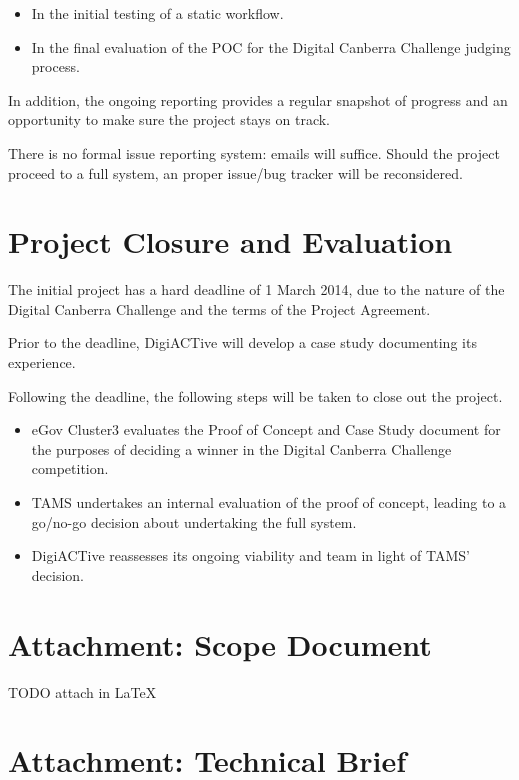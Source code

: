 \documentclass[12pt,a4paper,twosided]{article}
\begin{document}
\begin{itemize}
\itemsep1pt\parskip0pt
\item
  In the initial testing of a static workflow.
\item
  In the final evaluation of the POC for the Digital Canberra Challenge
  judging process.
\end{itemize}

In addition, the ongoing reporting provides a regular snapshot of
progress and an opportunity to make sure the project stays on track.

There is no formal issue reporting system: emails will suffice. Should
the project proceed to a full system, an proper issue/bug tracker will
be reconsidered.

\section{Project Closure and Evaluation}

The initial project has a hard deadline of 1 March 2014, due to the
nature of the Digital Canberra Challenge and the terms of the Project
Agreement.

Prior to the deadline, DigiACTive will develop a case study documenting
its experience.

Following the deadline, the following steps will be taken to close out
the project.

\begin{itemize}
\itemsep1pt\parskip0pt
\item
  eGov Cluster3 evaluates the Proof of Concept and Case Study document
  for the purposes of deciding a winner in the Digital Canberra
  Challenge competition.
\item
  TAMS undertakes an internal evaluation of the proof of concept,
  leading to a go/no-go decision about undertaking the full system.
\item
  DigiACTive reassesses its ongoing viability and team in light of TAMS'
  decision.
\end{itemize}

\section{Attachment: Scope Document}

TODO attach in LaTeX

\section{Attachment: Technical Brief}
\end{document}
